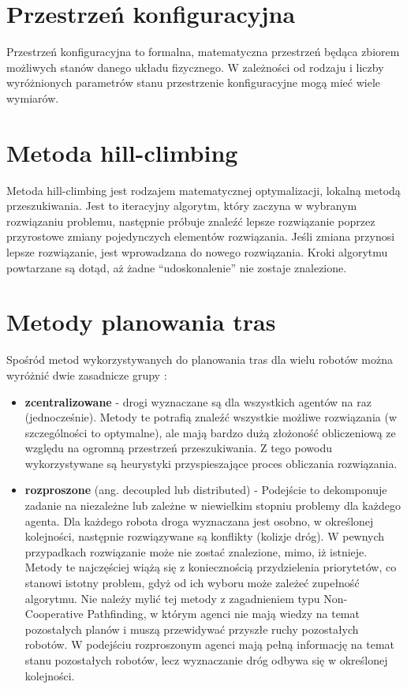\section{Przestrzeń konfiguracyjna}
Przestrzeń konfiguracyjna to formalna, matematyczna przestrzeń będąca zbiorem możliwych stanów danego układu fizycznego.
W zależności od rodzaju i liczby wyróżnionych parametrów stanu przestrzenie konfiguracyjne mogą mieć wiele wymiarów.

\section{Metoda hill-climbing}
Metoda hill-climbing jest rodzajem matematycznej optymalizacji, lokalną metodą przeszukiwania.
Jest to iteracyjny algorytm, który zaczyna w wybranym rozwiązaniu problemu, następnie próbuje znaleźć lepsze rozwiązanie poprzez przyrostowe zmiany pojedynczych elementów rozwiązania.
Jeśli zmiana przynosi lepsze rozwiązanie, jest wprowadzana do nowego rozwiązania.
Kroki algorytmu powtarzane są dotąd, aż żadne ``udoskonalenie'' nie zostaje znalezione.

\section{Metody planowania tras}
Spośród metod wykorzystywanych do planowania tras dla wielu robotów można wyróżnić dwie zasadnicze grupy \cite{latombe}:
\begin{itemize}
	\item {\bf zcentralizowane} - drogi wyznaczane są dla wszystkich agentów na raz (jednocześnie). Metody te potrafią znaleźć wszystkie możliwe rozwiązania (w szczególności to optymalne), ale mają bardzo dużą złożoność obliczeniową ze względu na ogromną przestrzeń przeszukiwania. Z tego powodu wykorzystywane są heurystyki przyspieszające proces obliczania rozwiązania.
	\item {\bf rozproszone} (ang. decoupled lub distributed) - Podejście to dekomponuje zadanie na niezależne lub zależne w niewielkim stopniu problemy dla każdego agenta. Dla każdego robota droga wyznaczana jest osobno, w określonej kolejności, następnie rozwiązywane są konflikty (kolizje dróg). W pewnych przypadkach rozwiązanie może nie zostać znalezione, mimo, iż istnieje. Metody te najczęściej wiążą się z koniecznością przydzielenia priorytetów, co stanowi istotny problem, gdyż od ich wyboru może zależeć zupełność algorytmu. Nie należy mylić tej metody z zagadnieniem typu Non-Cooperative Pathfinding, w którym agenci nie mają wiedzy na temat pozostałych planów i muszą przewidywać przyszłe ruchy pozostałych robotów. W podejściu rozproszonym agenci mają pełną informację na temat stanu pozostałych robotów, lecz wyznaczanie dróg odbywa się w określonej kolejności.
\end{itemize}

